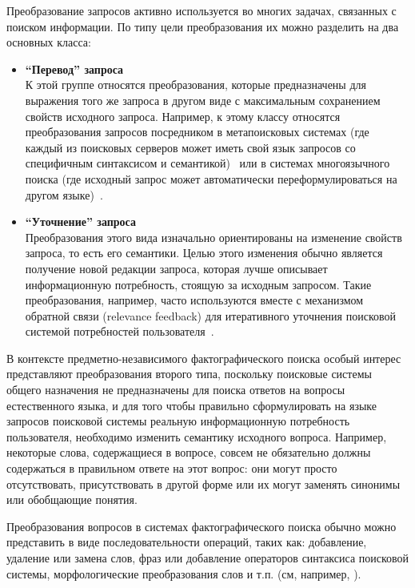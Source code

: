 \documentclass{article}
\begin{document}
Преобразование запросов активно используется во многих задачах, связанных с
поиском информации. По типу цели преобразования их можно разделить на
два основных класса:
\begin{itemize}
\item {\bf ``Перевод'' запроса}\\
К этой группе относятся преобразования, которые предназначены для выражения
того же запроса в другом виде с максимальным сохранением свойств исходного запроса. 
Например, к этому классу относятся преобразования запросов посредником в метапоисковых системах
(где каждый из поисковых серверов может иметь свой язык запросов со 
специфичным синтаксисом и семантикой)~\cite{admire} или в системах многоязычного поиска
(где исходный запрос может автоматически переформулироваться на другом
языке)~\cite{qa:AnswerBus}.

\item {\bf ``Уточнение'' запроса}\\
Преобразования этого вида изначально ориентированы на изменение свойств 
запроса, то есть его семантики. Целью этого изменения обычно
является получение новой редакции запроса, которая лучше описывает 
информационную потребность, стоящую за исходным запросом. Такие
преобразования, например, часто используются вместе с механизмом 
обратной связи (relevance feedback) для итеративного уточнения
поисковой системой потребностей пользователя~\cite{baeza99modernir}.
\end{itemize}

В контексте предметно-независимого фактографического поиска особый
интерес представляют преобразования второго типа,
поскольку поисковые системы общего назначения не предназначены
для поиска ответов на вопросы естественного языка,
и для того чтобы правильно сформулировать на языке запросов поисковой системы
реальную информационную потребность пользователя,
необходимо изменить семантику исходного вопроса.
Например, некоторые слова, содержащиеся в вопросе, совсем не обязательно
должны содержаться в правильном ответе на этот вопрос:
они могут просто отсутствовать, присутствовать в другой форме или
их могут заменять синонимы или обобщающие понятия.

Преобразования вопросов в системах фактографического поиска
обычно можно представить в виде последовательности операций, таких как:
добавление, удаление или замена слов, фраз или добавление
операторов синтаксиса поисковой системы,
морфологические преобразования слов и т.п. (см, например, \cite{qa:Mulder}).
\end{document}
